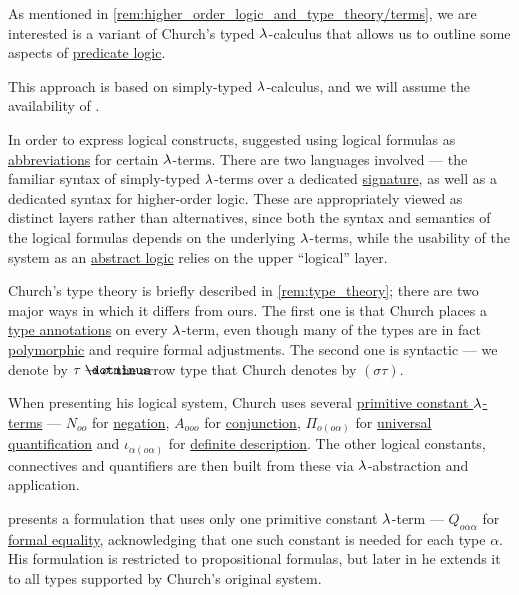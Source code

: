 \begin{remark}\label{rem:simply_typed_hol}
  As mentioned in \cref{rem:higher_order_logic_and_type_theory/terms}, we are interested is a variant of Church's typed \( {\mathrm \lambda} \)-calculus that allows us to outline some aspects of \hyperref[rem:predicate_logic]{predicate logic}.

  This approach is based on simply-typed \( {\mathrm \lambda} \)-calculus, and we will assume the availability of .

  In order to express logical constructs,  suggested using logical formulas as \hyperref[con:metalingual_abbreviation]{abbreviations} for certain \( {\mathrm \lambda} \)-terms. There are two languages involved --- the familiar syntax of simply-typed \( {\mathrm \lambda} \)-terms over a dedicated \hyperref[def:simple_type_signature]{signature}, as well as a dedicated syntax for higher-order logic. These are appropriately viewed as distinct layers rather than alternatives, since both the syntax and semantics of the logical formulas depends on the underlying \( {\mathrm \lambda} \)-terms, while the usability of the system as an \hyperref[def:abstract_logic]{abstract logic} relies on the upper \enquote{logical} layer.

  Church's type theory is briefly described in \cref{rem:type_theory}; there are two major ways in which it differs from ours. The first one is that Church places a \hyperref[con:type_annotation]{type annotations} on every \( {\mathrm \lambda} \)-term, even though many of the types are in fact \hyperref[def:polymorphic_typed_lambda_calculus]{polymorphic} and require formal adjustments. The second one is syntactic --- we denote by \( \tau \synimplies \sigma \) the arrow type that Church denotes by \( (\sigma\tau) \).

  When presenting his logical system, Church uses several \hyperref[con:primitive_notion]{primitive constant \( {\mathrm \lambda} \)-terms} --- \( N_{oo} \) for \hyperref[def:propositional_alphabet/negation]{negation}, \( A_{ooo} \) for \hyperref[def:propositional_alphabet/connectives/conjunction]{conjunction}, \( \Pi_{o(o\alpha)} \) for \hyperref[def:predicate_logic_alphabet/quantifiers/universal]{universal quantification} and \( \iota_{\alpha(o\alpha)} \) for \hyperref[con:description_operator/iota]{definite description}. The other logical constants, connectives and quantifiers are then built from these via \( {\mathrm \lambda} \)-abstraction and application.

   presents a formulation that uses only one primitive constant \( {\mathrm \lambda} \)-term --- \( Q_{o \alpha \alpha } \) for \hyperref[def:predicate_logic_alphabet/equality]{formal equality}, acknowledging that one such constant is needed for each type \( \alpha \). His formulation is restricted to propositional formulas, but later in \cite{Henkin1975Identity} he extends it to all types supported by Church's original system.


\end{remark}
